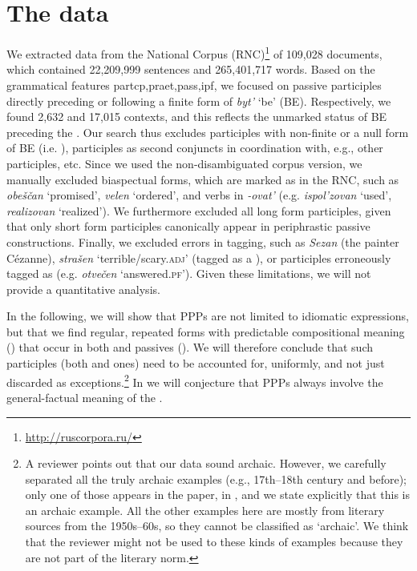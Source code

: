 \documentclass[output=paper,modfonts,newtxmath,hidelinks
\ChapterDOI{10.5281/zenodo.2545513}
]{langscibook}
\begin{document}
\section{The data}
\label{data}

We extracted data from the  National Corpus (RNC)\footnote{\url{http://ruscorpora.ru/}} of 109,028 documents, which contained 22,209,999 sentences and 265,401,717 words.  Based on the grammatical features partcp,praet,pass,ipf, we focused on   passive participles directly preceding or following a finite form of \textit{byt'} `be' (BE). Respectively, we found 2,632 and 17,015 contexts, and this reflects the unmarked  status of BE preceding the . Our search thus excludes participles with non-finite or a null form of BE (i.e. ), participles as second conjuncts in coordination with, e.g., other participles, etc. Since we used the non-disambiguated corpus version, we manually excluded biaspectual forms, which are marked as  in the RNC, such as \textit{obeščan} `promised', \textit{velen} `ordered', and verbs in \textit{-ovat'} (e.g. \textit{ispol'zovan} `used', \textit{realizovan} `realized'). We furthermore excluded all long form participles, given that only short form participles canonically appear in  periphrastic passive constructions. Finally, we excluded errors in tagging, such as \textit{Sezan} (the  painter Cézanne), \textit{strašen} `terrible/scary.\textsc{adj}' (tagged as a ), or  participles erroneously tagged as  (e.g. \textit{otvečen} `answered.\textsc{pf}'). Given these limitations, we will not provide a quantitative analysis. 
 
\largerpage
In the following, we will show that  PPPs are not limited to idiomatic expressions, but that we find regular, repeated forms with predictable compositional meaning () that occur in both  and  passives (). We will therefore conclude that such participles (both  and  ones) need to be accounted for, uniformly, and not just discarded as exceptions.\footnote{A reviewer points out that our data sound archaic. However, we carefully separated all the truly archaic examples (e.g., 17th--18th century and before); only one of those appears in the paper, in , and we state explicitly that this is an archaic example. All the other examples here are mostly from literary sources from the 1950s--60s, so they cannot be classified as `archaic'. We think that the reviewer might not be used to these kinds of examples because they are not part of the literary norm.} In  we will conjecture that  PPPs always involve the general-factual meaning of the .
\end{document}
